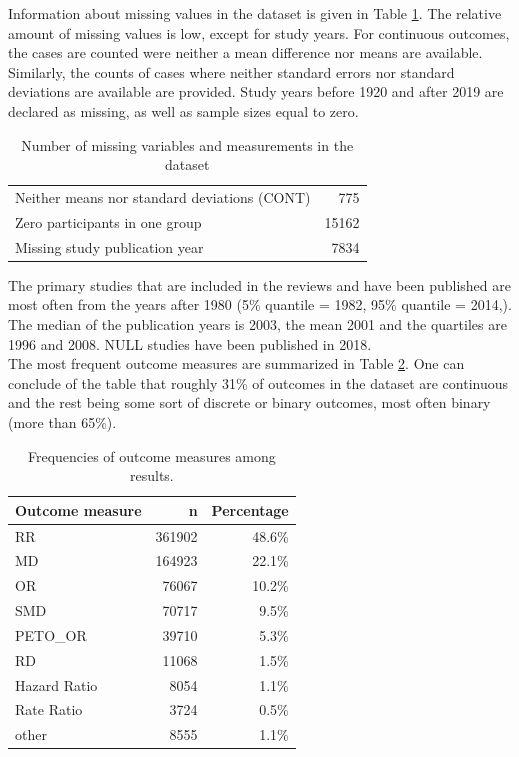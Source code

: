 \documentclass[11pt,a4paper,twoside]{book}\usepackage[]{graphicx}\usepackage[]{color}
\begin{document}
Information about missing values in the dataset is given in Table \ref{missing}. The relative amount of missing values is low, except for study years. For continuous outcomes, the cases are counted were neither a mean difference nor means are available. Similarly, the counts of cases where neither standard errors nor standard deviations are available are provided. Study years before 1920 and after 2019 are declared as missing, as well as sample sizes equal to zero.

\begin{table}[ht]
\centering
\begingroup\footnotesize
\begin{tabular}{lr}
  \hline
  \hline
Neither means nor standard deviations (CONT) & 775 \\ 
  Zero participants in one group & 15162 \\ 
  Missing study publication year & 7834 \\ 
   \hline
\end{tabular}
\endgroup
\caption{Number of missing variables and measurements in the dataset} 
\label{missing}
\end{table}


The primary studies that are included in the reviews and have been published are most often from the years after 1980 (5\% quantile = 1982, 95\% quantile = 2014,). The median of the publication years is 2003, the mean 2001 and the quartiles are 1996 and 2008. NULL studies have been published in 2018.\\
The most frequent outcome measures are summarized in Table \ref{outcome.measure.frequencies}. One can conclude of the table that roughly 31\% of outcomes in the dataset are continuous and the rest being some sort of discrete or binary outcomes, most often binary (more than 65\%).

\begin{table}[ht]
\centering
\begingroup\footnotesize
\begin{tabular}{lrr}
  \hline
Outcome measure & n & Percentage \\ 
  \hline
RR & 361902 & 48.6\% \\ 
  MD & 164923 & 22.1\% \\ 
  OR & 76067 & 10.2\% \\ 
  SMD & 70717 & 9.5\% \\ 
  PETO\_OR & 39710 & 5.3\% \\ 
  RD & 11068 & 1.5\% \\ 
  Hazard Ratio & 8054 & 1.1\% \\ 
  Rate Ratio & 3724 & 0.5\% \\ 
  other & 8555 & 1.1\% \\ 
   \hline
\end{tabular}
\endgroup
\caption{Frequencies of outcome measures among results.} 
\label{outcome.measure.frequencies}
\end{table}
\end{document}
